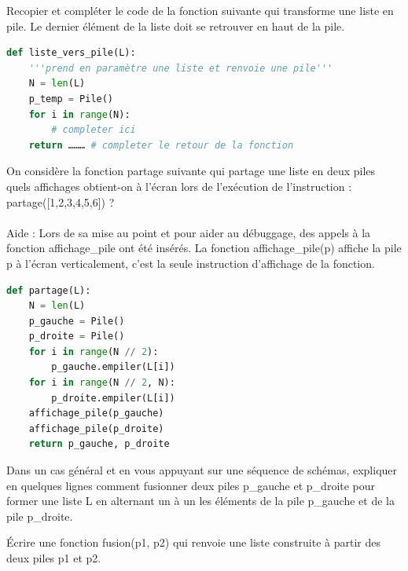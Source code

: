 \documentclass[a4paper, noanswers, addpoints, 12pt]{exam}
\begin{document}
\begin{questions}
\question[2] Recopier et compléter le code de la fonction suivante qui transforme une liste
en pile. Le dernier élément de la liste doit se retrouver en haut de la pile.
\begin{lstlisting}[language=Python]
def liste_vers_pile(L):
    '''prend en paramètre une liste et renvoie une pile'''
    N = len(L)
    p_temp = Pile()
    for i in range(N):
        # completer ici
    return ……… # completer le retour de la fonction
\end{lstlisting}

\question[2] On considère la fonction partage suivante qui partage une liste en deux piles quels affichages obtient-on à l'écran lors de l'exécution de l'instruction :
partage([1,2,3,4,5,6]) ?\\\\
Aide : Lors de sa mise au point et pour aider au débuggage, des appels à la fonction affichage\_pile ont été insérés. La fonction affichage\_pile(p) affiche la pile p à l'écran verticalement, c'est la seule instruction d'affichage de la fonction.

\begin{lstlisting}[language=Python]
def partage(L):
    N = len(L)
    p_gauche = Pile()
    p_droite = Pile()
    for i in range(N // 2):
        p_gauche.empiler(L[i])
    for i in range(N // 2, N):
        p_droite.empiler(L[i])
    affichage_pile(p_gauche)
    affichage_pile(p_droite)
    return p_gauche, p_droite
\end{lstlisting}

\question[1] Dans un cas général et en vous appuyant sur une séquence de schémas, expliquer en quelques lignes comment fusionner deux piles p\_gauche et p\_droite pour former une liste L en alternant un à un les éléments de la pile p\_gauche et de la pile p\_droite.

\question[2] Écrire une fonction fusion(p1, p2) qui renvoie une liste construite à partir
des deux piles p1 et p2.

\end{questions}
\end{document}
